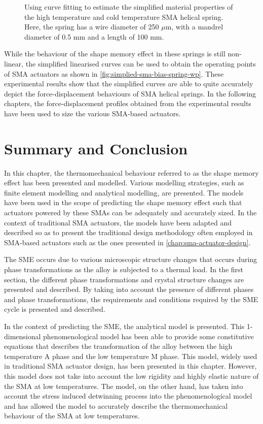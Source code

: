 \begin{figure}[hbt]
    \centering
    \resizebox{0.75\textwidth}{!}{}
    \caption{Using curve fitting to estimate the simplified material properties of the high temperature and cold temperature SMA helical spring. Here, the spring has a wire diameter of 250 $\mu$m, with a mandrel diameter of 0.5 mm and a length of 100 mm.}
    \label{fig:sma-coil-curve-fit}
\end{figure}

While the behaviour of the shape memory effect in these springs is still non-linear, the simplified linearised curves can be used to obtain the operating points of SMA actuators as shown in \cref{fig:simplied-sma-bias-spring-wp}. These experimental results show that the simplified curves are able to quite accurately depict the force-displacement behaviours of SMA helical springs. In the following chapters, the force-displacement profiles obtained from the experimental results have been used to size the various SMA-based actuators.

\section{Summary and Conclusion}
In this chapter, the thermomechanical behaviour referred to as the shape memory effect has been presented and modelled. Various modelling strategies, such as finite element modelling and analytical modelling, are presented. The models have been used in the scope of predicting the shape memory effect such that actuators powered by these SMAs can be adequately and accurately sized. In the context of traditional SMA actuators, the models have been adapted and described so as to present the traditional design methodology often employed in SMA-based actuators such as the ones presented in \cref{chap:sma-actuator-design}.

The SME occurs due to various microscopic structure changes that occurs during phase transformations as the alloy is subjected to a thermal load. In the first section, the different phase transformations and crystal structure changes are presented and described. By taking into account the presence of different phases and phase transformations, the requirements and conditions required by the SME cycle is presented and described.

In the context of predicting the SME, the \cite{liangConstitutiveModelingShape1990a} analytical model is presented. This 1-dimensional phenomenological model has been able to provide some constitutive equations that describes the transformation of the alloy between the high temperature A phase and the low temperature M phase. This model, widely used in traditional SMA actuator design, has been presented in this chapter. However, this model does not take into account the low rigidity and highly elastic nature of the SMA at low temperatures. The \cite{brinsonOneDimensionalConstitutiveBehavior1993} model, on the other hand, has taken into account the stress induced detwinning process into the phenomenological model and has allowed the model to accurately describe the thermomechanical behaviour of the SMA at low temperatures.

